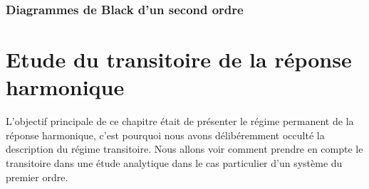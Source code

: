 \subsubsection{Diagrammes de Black d'un second ordre}

\section{Etude du transitoire de la réponse harmonique}
L'objectif principale de ce chapitre était de présenter le régime permanent
de la réponse harmonique, c'est pourquoi nous avons délibéremment occulté 
la description du régime transitoire.
Nous allons voir comment prendre en compte le transitoire dans une étude
analytique dans le cas particulier d'un système du premier ordre.

